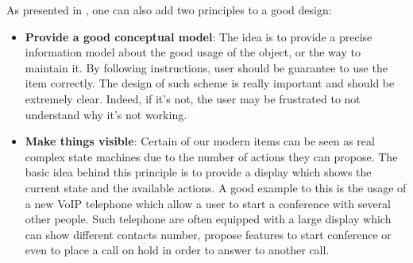 \documentclass[a4paper,11pt] {article}
\theoremstyle{definition}
\begin{document}
As presented in \cite{Norman02}
, one can also add two principles to a good design:
\begin{itemize}
\item \textbf{Provide a good conceptual model}: The idea is to provide a precise information model about the good usage of the object, or the way to maintain it. By following instructions, user should be guarantee to use the item correctly. The design of such scheme is really important and should be extremely clear. Indeed, if it's not, the user may be frustrated to not understand why it's not working.
\item \textbf{Make things visible}: Certain of our modern items can be seen as real complex state machines due to the number of actions they can propose. The basic idea behind this principle is to provide a display which shows the current state and the available actions. A good example to this is the usage of a new VoIP telephone which allow a user to start a conference with several other people. Such telephone are often equipped with a large display which can show different contacts number, propose features to start conference or even to place a call on hold in order to answer to another call.
\end{itemize}
\end{document}
